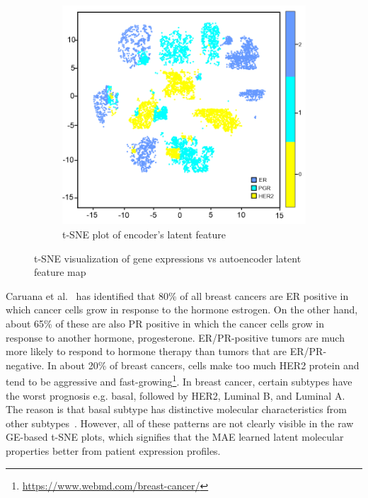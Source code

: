 \begin{figure}
\begin{subfigure}{0.48\linewidth}
		\includegraphics[scale=0.7]{images/ae_tsne.png}
		\caption{t-SNE plot of encoder's latent feature}
        \label{fig:tsne_ae}
	\end{subfigure}
	 \setlength{\belowcaptionskip}{-8pt}
	\caption{t-SNE visualization of gene expressions vs autoencoder latent feature map~\cite{karimACCESS2019}} 
	\label{fig:tnse}
\end{figure}

\hspace*{3.5mm} Caruana et al.~\cite{91Caruana} has identified that 80\% of all breast cancers are ER positive in which cancer cells grow in response to the hormone estrogen. On the other hand, about 65\% of these are also PR positive in which the cancer cells grow in response to another hormone, progesterone. ER/PR-positive tumors are much more likely to respond to hormone therapy than tumors that are ER/PR-negative. In about 20\% of breast cancers, cells make too much HER2 protein and tend to be aggressive and fast-growing\footnote{\url{https://www.webmd.com/breast-cancer/}}. In breast cancer, certain subtypes have the worst prognosis e.g. basal, followed by HER2, Luminal B, and Luminal A. The reason is that basal subtype has distinctive molecular characteristics from other subtypes~\cite{bertucci2012basal}. However, all of these patterns are not clearly visible in the raw GE-based t-SNE plots, which signifies that the MAE learned latent molecular properties better from patient expression profiles.

